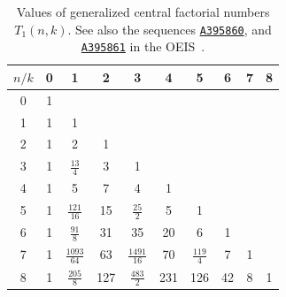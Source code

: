 \begin{table}[H]
  \begin{center}
    \setlength\extrarowheight{-6pt}
    \begin{tabular}{c|ccccccccc}
      $n/k$ & 0 & 1 & 2 & 3 & 4 & 5 & 6 & 7 & 8 \\ [3px]
      \hline
      0 & 1 &   &   &   &   &   &   &   &   \\
      1 & 1 & 1 &   &   &   &   &   &   &   \\
      2 & 1 & 2 & 1 &   &   &   &   &   &   \\
      3 & 1 & $\tfrac{13}{4}$ & 3 & 1 &   &   &   &   &   \\
      4 & 1 & 5 & 7 & 4 & 1 &   &   &   &   \\
      5 & 1 & $\tfrac{121}{16}$ & 15 & $\tfrac{25}{2}$ & 5 & 1 &   &   &   \\
      6 & 1 & $\tfrac{91}{8}$ & 31 & 35 & 20 & 6 & 1 &   &   \\
      7 & 1 & $\tfrac{1093}{64}$ & 63 & $\tfrac{1491}{16}$ & 70 & $\tfrac{119}{4}$ & 7 & 1 &   \\
      8 & 1 & $\tfrac{205}{8}$ & 127 & $\tfrac{483}{2}$ & 231 & 126 & 42 & 8 & 1 \\
    \end{tabular}
  \end{center}
  \caption{
    Values of generalized central factorial numbers $T_1(n,k)$.
    See also the sequences \href{https://oeis.org/A395860}{\texttt{A395860}},
    and \href{https://oeis.org/A395861}{\texttt{A395861}} in the OEIS~\cite{sloane2003line}.
  }
  \label{tab:central-factorial-numbers-t1}
\end{table}
